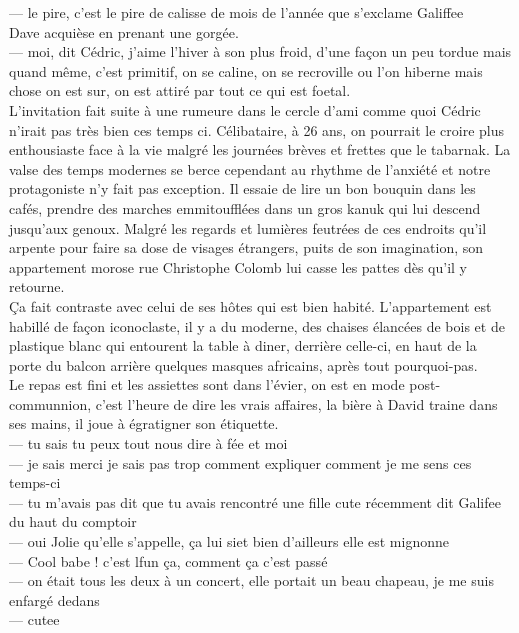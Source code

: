 \documentclass{article}
\begin{document}
--- le pire, c'est le pire de calisse de mois de l'année que s'exclame Galiffee\\
Dave acquièse en prenant une gorgée.\\
--- moi, dit Cédric, j'aime l'hiver à son plus froid, d'une façon un peu tordue mais quand même,
c'est primitif, on se caline, on se recroville ou l'on hiberne mais chose on est sur,
on est attiré par tout ce qui est foetal.\\

L'invitation fait suite à une rumeure dans le cercle d'ami comme quoi Cédric
n'irait pas très bien ces temps ci. Célibataire, à 26 ans, on pourrait le croire
plus enthousiaste face à la vie malgré les journées brèves et frettes que le
tabarnak. La valse des temps modernes se berce cependant au rhythme de l'anxiété
et notre protagoniste n'y fait pas exception. Il essaie de lire un bon bouquin
dans les cafés, prendre des marches emmitoufflées dans un gros kanuk qui lui
descend jusqu'aux genoux. Malgré les regards et lumières feutrées de ces
endroits qu'il arpente pour faire sa dose de visages étrangers, puits de son
imagination, son appartement morose rue Christophe Colomb lui casse les pattes
dès qu'il y retourne.\\

Ça fait contraste avec celui de ses hôtes qui est bien habité. L'appartement est
habillé de façon iconoclaste, il y a du moderne, des chaises élancées de bois et
de plastique blanc qui entourent la table à diner, derrière celle-ci, en haut de
la porte du balcon arrière quelques masques africains, après tout
pourquoi-pas.\\

Le repas est fini et les assiettes sont dans l'évier, on est en mode post-communnion,
c'est l'heure de dire les vrais affaires, la bière à David traine dans ses mains, il
joue à égratigner son étiquette.\\

--- tu sais tu peux tout nous dire à fée et moi \\
--- je sais merci je sais pas trop comment expliquer comment je me sens ces temps-ci\\
--- tu m'avais pas dit que tu avais rencontré une fille cute récemment dit Galifee du
haut du comptoir\\
--- oui Jolie qu'elle s'appelle, ça lui siet bien d'ailleurs elle est mignonne\\
--- Cool babe ! c'est lfun ça, comment ça c'est passé\\
--- on était tous les deux à un concert, elle portait un beau chapeau, je me suis enfargé dedans\\
--- cutee\\
\end{document}

